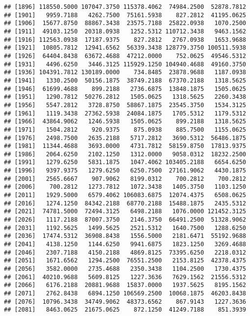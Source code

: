\documentclass[]{article}
\begin{document}
\begin{verbatim}
## [1896] 118550.5000 107047.3750 115378.4062  74984.2500  52878.7812
## [1901]   9959.7188   4262.7500  75161.5938    827.2812  41195.0625
## [1906]  15677.8750  88867.3438  23575.7188  25822.0938   1070.2500
## [1911]  49103.1250  20318.0938   1252.5312 110712.3438   9463.1562
## [1916] 112563.0938  17187.9375    827.2812   2767.0938   1653.9688
## [1921]  10805.7812  12941.6562  56339.3438 128779.3750 100511.5938
## [1926]  64404.8438  63672.4688  47212.0000    752.0625  49546.5312
## [1931]   4496.6250   3446.3125 115929.1250 104940.4688  49160.3750
## [1936] 104391.7812 130189.0000    734.8485  23878.9688   1187.0938
## [1941]   1330.2500  50156.1875  38749.2188  67370.2188   1318.5625
## [1946]  61699.4688    899.2188   2736.6875  13848.1875   1505.0625
## [1951]   1290.7812  50276.2812   1505.0625   1318.5625   2260.3438
## [1956]   5547.2812   3728.8750  58867.1875  23545.3750   1534.3125
## [1961]   1119.3438  27362.5938  24084.1875   1705.5312   1179.5312
## [1966]  43864.9062   1246.5938   1505.0625    899.2188   1318.5625
## [1971]   1504.2812    920.9375    875.0938    885.7500   1155.0625
## [1976]   2498.7500   2635.2188   5717.2812   3690.5312  56486.1875
## [1981]  11344.4688   3693.0000   4731.7812  58159.8750  17813.9375
## [1986]   2064.6250   2102.1250   1312.0000   9058.0312  18232.2500
## [1991]   1279.6250   5831.1875   1047.4062 103405.2188   6654.6250
## [1996]   9397.9375   1279.6250   6250.7500  27161.9062   4430.1875
## [2001]   2565.6667    907.9062   8199.0312    700.2812    700.2812
## [2006]    700.2812   1273.7812   1072.3438   1405.3750   1103.1250
## [2011]   1929.5000   6579.4062 106083.6875  12074.4375   6508.0625
## [2016]   1274.1250  84342.2188  68770.2188  15488.1875   2435.5312
## [2021]  74781.5000  72494.3125   6498.2188   1076.0000 121452.3125
## [2026]   1117.2188  87007.3750   2146.3750  66491.2500  51328.9062
## [2031]   1192.5625   1499.5625   2521.5312   1640.7500   1288.6250
## [2036]  17474.5312  36908.8438   1556.5000   2181.6471  55192.9688
## [2041]   4138.1250   1144.6250   9941.6875   1823.1250   3269.4688
## [2046]   2307.7188   4150.2188   4869.8125  73395.6250   2218.0312
## [2051]   1671.6562   1294.2500  76551.2500   2153.8125  42378.4375
## [2056]   3582.0000   2735.4688   2350.3438   1104.2500   1730.4375
## [2061]  40210.9688   5609.8125   1227.3636   7629.1562  21556.5312
## [2066]   6176.2188  20881.9688  15837.0000   1937.5625   8195.1562
## [2071]   2762.8438   6894.1250 106569.2500  10068.1875  46203.8438
## [2076]  10796.3438  34749.9062  48373.6562    867.9143   1227.3636
## [2081]   8463.0625  21675.0625    872.1250  41249.7188    851.3939

\end{verbatim}
\end{document}
